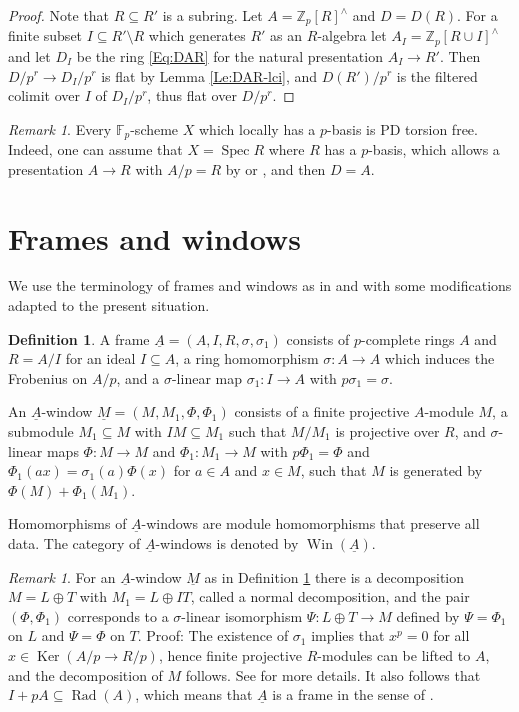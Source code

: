 \documentclass[a4paper,11pt]{article}
\theoremstyle{plain}
\theoremstyle{definition}
\newtheorem{Defn}[Lemma]{Definition}
\theoremstyle{remark}
\newtheorem{Remark}[Lemma]{Remark}
\theoremstyle{definition}
\numberwithin{Lemma}{section}
\numberwithin{Subpoint}{Lemma}
\numberwithin{equation}{section}
\newcommand{\FF}{{\mathbb{F}}}
\newcommand{\ZZ}{{\mathbb{Z}}}
\DeclareMathOperator{\Ker}{Ker}
\DeclareMathOperator{\Spec}{Spec}
\DeclareMathOperator{\Rad}{Rad}
\DeclareMathOperator{\Win}{Win}
\renewcommand{\u}{\underline}
\newcommand{\chang}[1]{{#1}}
\begin{document}
\begin{proof}
Note that $R\subseteq R'$ is a subring.
Let $A=\ZZ_p[R]^\wedge$ and $D=D(R)$. 
For a finite subset $I\subseteq R'\setminus R$ 
which generates $R'$ as an $R$-algebra let $A_I=\ZZ_p[R\cup I]^\wedge$ 
and let $D_I$ be the ring \eqref{Eq:DAR} for the natural presentation $A_I\to R'$.
Then $D/p^r\to D_I/p^r$ is flat by Lemma \ref{Le:DAR-lci},
and $D(R')/p^r$ is the filtered colimit over $I$ of $D_I/p^r$,
thus flat over $D/p^r$.
\end{proof}

\begin{Remark}
\label{Re:pbasis-pd-tf}
\chang{Every $\FF_p$-scheme $X$ which locally has a $p$-basis is PD torsion free. Indeed, one can assume that $X=\Spec R$ where $R$ has a $p$-basis, which allows a presentation $A\to R$ with $A/p=R$ by \cite[Prop.~1.1.7]{Berthelot-Messing} or \cite[Lemmas 1.1.2 \& 1.2.2]{Jong:Crystalline}, and then $D=A$.}
\end{Remark}


\section{Frames and windows}
\label{Se:frames}

We use the terminology of frames and windows
as in \cite{Zink:Windows} and \cite{Lau:Frames}
with some modifications adapted to the present situation.

\begin{Defn}
\label{Def:frame}
A frame $\u A=(A,I,R,\sigma,\sigma_1)$
consists of \chang{$p$-complete} rings $A$ and $R=A/I$ for an ideal $I\subseteq A$,
a ring homomorphism $\sigma:A\to A$ which induces the Frobenius
on $A/p$, and a $\sigma$-linear map $\sigma_1:I\to A$ with $p\sigma_1=\sigma$.

An $\u A$-window $\u M=(M,M_1,\Phi,\Phi_1)$ 
consists of a finite projective $A$-module $M$, 
a submodule $M_1\subseteq M$ with $IM\subseteq M_1$ such that
$M/M_1$ is projective over $R$,
and $\sigma$-linear maps $\Phi:M\to M$ and $\Phi_1:M_1\to M$ 
with $p\Phi_1=\Phi$ and $\Phi_1(ax)=\sigma_1(a)\Phi(x)$ 
for $a\in A$ and $x\in M$,
such that $M$ is generated by $\Phi(M)+\Phi_1(M_1)$.

Homomorphisms of $\u A$-windows are module homomorphisms
that preserve all data. 
The category of $\u A$-windows is denoted by $\Win(\u A)$.
\end{Defn}

\begin{Remark}
\label{Rk:Psi}
For an $\u A$-window $\u M$ as in Definition \ref{Def:frame}
there is a decomposition $M=L\oplus T$ with $M_1=L\oplus IT$, 
called a normal decomposition,
and the pair $(\Phi,\Phi_1)$ corresponds
to a $\sigma$-linear isomorphism $\Psi:L\oplus T\to M$
defined by $\Psi=\Phi_1$ on $L$ and $\Psi=\Phi$ on $T$.
Proof:
The existence of $\sigma_1$ implies that $x^p=0$ 
for \chang{all} $x\in\Ker(A/p\to R/p)$,
hence finite projective $R$-modules can be lifted to $A$,
and the decomposition of $M$ follows.
See \cite[Lemma 2.6]{Lau:Frames} for more details.
It also follows that $I+pA\subseteq\Rad(A)$,
which means that $\u A$ is a frame in the sense of \cite[Def.~2.1]{Lau:Frames}.
\end{Remark}
\end{document}
